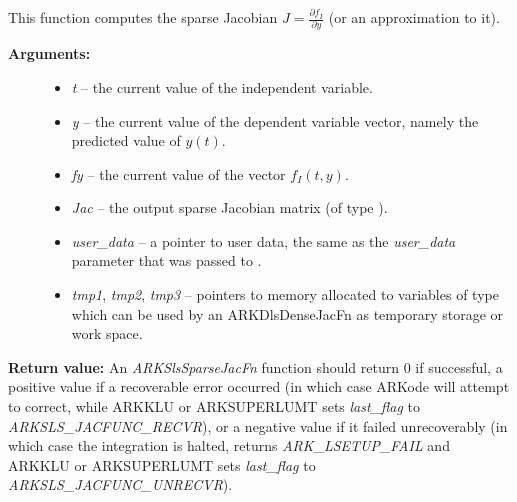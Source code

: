 \documentclass[letterpaper,10pt,english]{sphinxmanual}
\begin{document}
\begin{fulllineitems}
\label{c_interface/User_supplied:ARKSlsSparseJacFn}
This function computes the sparse Jacobian $J =
\frac{\partial f_I}{\partial y}$ (or an approximation to it).
\begin{description}
\item[{\textbf{Arguments:}}] \leavevmode\begin{itemize}
\item {} 
\emph{t} -- the current value of the independent variable.

\item {} 
\emph{y} -- the current value of the dependent variable vector, namely
the predicted value of $y(t)$.

\item {} 
\emph{fy} -- the current value of the vector $f_I(t,y)$.

\item {} 
\emph{Jac} -- the output sparse Jacobian matrix (of type ).

\item {} 
\emph{user\_data} -- a pointer to user data, the same as the
\emph{user\_data} parameter that was passed to {\hyperref[c_interface/User_callable:ARKodeSetUserData]{}}.

\item {} 
\emph{tmp1}, \emph{tmp2}, \emph{tmp3} -- pointers to memory allocated to
variables of type  which can be used by an
ARKDlsDenseJacFn as temporary storage or work space.

\end{itemize}

\end{description}

\textbf{Return value:}
An \emph{ARKSlsSparseJacFn} function should return 0 if
successful, a positive value if a recoverable error occurred (in
which case ARKode will attempt to correct, while ARKKLU or ARKSUPERLUMT
sets \emph{last\_flag} to \emph{ARKSLS\_JACFUNC\_RECVR}), or a negative
value if it failed unrecoverably (in which case the integration is
halted, {\hyperref[c_interface/User_callable:ARKode]{}} returns \emph{ARK\_LSETUP\_FAIL} and
ARKKLU or ARKSUPERLUMT sets \emph{last\_flag} to \emph{ARKSLS\_JACFUNC\_UNRECVR}).


\end{fulllineitems}
\end{document}
